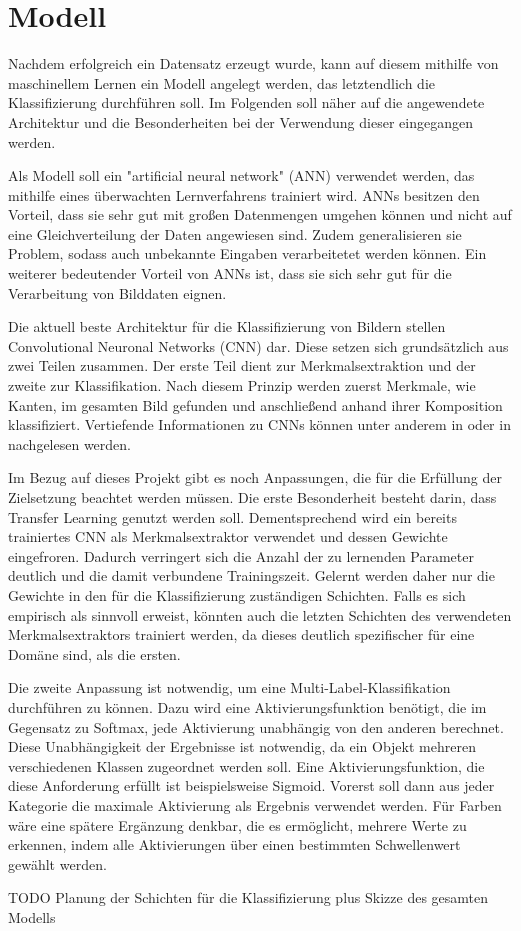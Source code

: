 \section{Modell} \label{sec:model}

Nachdem erfolgreich ein Datensatz erzeugt wurde, kann auf diesem mithilfe von maschinellem Lernen ein Modell angelegt werden, das letztendlich die Klassifizierung durchführen soll. Im Folgenden soll näher auf die angewendete Architektur und die Besonderheiten bei der Verwendung dieser eingegangen werden.

Als Modell soll ein "artificial neural network" (ANN) verwendet werden, das mithilfe eines überwachten Lernverfahrens trainiert wird. ANNs besitzen den Vorteil, dass sie sehr gut mit großen Datenmengen umgehen können und nicht auf eine Gleichverteilung der Daten angewiesen sind. Zudem generalisieren sie Problem, sodass auch unbekannte Eingaben verarbeitetet werden können. Ein weiterer bedeutender Vorteil von ANNs ist, dass sie sich sehr gut für die Verarbeitung von Bilddaten eignen. \cite{Mahanta2020}

Die aktuell beste Architektur für die Klassifizierung von Bildern stellen Convolutional Neuronal Networks (CNN) dar. Diese setzen sich grundsätzlich aus zwei Teilen zusammen. Der erste Teil dient zur Merkmalsextraktion und der zweite zur Klassifikation. Nach diesem Prinzip werden zuerst Merkmale, wie Kanten, im gesamten Bild gefunden und anschließend anhand ihrer Komposition klassifiziert. Vertiefende Informationen zu CNNs können unter anderem in \cite{Goodfellow2016} oder in \cite{CS2020} nachgelesen werden.

Im Bezug auf dieses Projekt gibt es noch Anpassungen, die für die Erfüllung der Zielsetzung beachtet werden müssen. Die erste Besonderheit besteht darin, dass Transfer Learning genutzt werden soll. Dementsprechend wird ein bereits trainiertes CNN als Merkmalsextraktor verwendet und dessen Gewichte eingefroren. Dadurch verringert sich die Anzahl der zu lernenden Parameter deutlich und die damit verbundene Trainingszeit. Gelernt werden daher nur die Gewichte in den für die Klassifizierung zuständigen Schichten. Falls es sich empirisch als sinnvoll erweist, könnten auch die letzten Schichten des verwendeten Merkmalsextraktors trainiert werden, da dieses deutlich spezifischer für eine Domäne sind, als die ersten. 

Die zweite Anpassung ist notwendig, um eine Multi-Label-Klassifikation durchführen zu können. Dazu wird eine Aktivierungsfunktion benötigt, die im Gegensatz zu Softmax, jede Aktivierung unabhängig von den anderen berechnet. Diese Unabhängigkeit der Ergebnisse ist notwendig, da ein Objekt mehreren verschiedenen Klassen zugeordnet werden soll. Eine Aktivierungsfunktion, die diese Anforderung erfüllt ist beispielsweise Sigmoid. Vorerst soll dann aus jeder Kategorie die maximale Aktivierung als Ergebnis verwendet werden. Für Farben wäre eine spätere Ergänzung denkbar, die es ermöglicht, mehrere Werte zu erkennen, indem alle Aktivierungen über einen bestimmten Schwellenwert gewählt werden. 

TODO Planung der Schichten für die Klassifizierung plus Skizze des gesamten Modells

